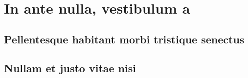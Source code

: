 \chapter{In ante nulla, vestibulum a}
\label{cha:intro}


\section{Pellentesque habitant morbi tristique senectus}
\label{sec:context}


\section{Nullam et justo vitae nisi}
\label{sec:problem}



